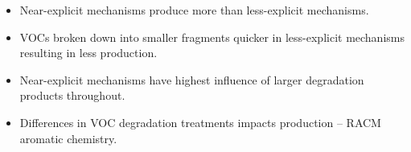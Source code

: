 \begin{BlueBox}
    \vskip-1cm
    \begin{block}{}
        \begin{itemize}
            \item Near-explicit mechanisms produce more  than less-explicit mechanisms. \vspace{10mm}
            \item VOCs broken down into smaller fragments quicker in less-explicit mechanisms resulting in less  production. \vspace{10mm} 
            \item Near-explicit mechanisms have highest influence of larger degradation products throughout. \vspace{10mm}
            \item Differences in VOC degradation treatments impacts  production -- RACM aromatic chemistry. \vspace{10mm}
        \end{itemize}        
    \end{block}
\end{BlueBox}
